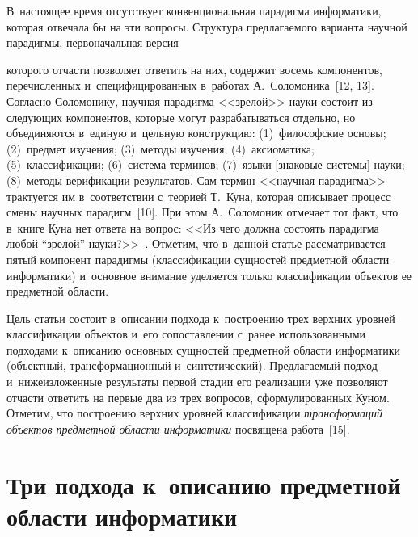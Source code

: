 \begin{multicols}{2}
  В~настоящее время отсутствует конвенциональная парадигма информатики, 
которая отвечала бы на эти вопросы. Структура предлагаемого варианта 
научной парадигмы, первоначальная версия\linebreak\vspace*{-12pt}

\pagebreak

\noindent
 которого отчасти позволяет 
ответить на них, содержит восемь компонентов, перечисленных 
и~специфицированных в~работах А.~Соломоника~[12, 13]. Согласно 
Соломонику, научная парадигма <<зрелой>> науки состоит из следующих 
компонентов, которые могут разрабатываться отдельно, но объединяются 
в~единую и~цельную конструкцию: (1)~философские основы; (2)~предмет 
изучения; (3)~методы изучения; (4)~аксиоматика; (5)~классификации;  
(6)~сис\-те\-ма терминов; (7)~языки [знаковые системы] науки; (8)~методы 
верификации результатов. Сам термин <<научная парадигма>> трактуется им 
в~соответствии с~теорией Т.~Куна, которая описывает процесс смены научных 
парадигм~[10]. При этом А.~Соломоник отмечает тот факт, что в~книге Куна 
нет ответа на вопрос: <<Из чего должна состоять парадигма любой ``зрелой'' 
науки?>>~\cite[с.~23]{14-zac}. Отметим, что в~данной статье рассматривается 
пятый компонент парадигмы (классификации сущностей предметной об\-ласти 
информатики) и~основное внимание уделяется только классификации объектов 
ее предметной об\-ласти.
  
  Цель статьи состоит в~описании подхода к~построению трех верхних уровней 
классификации объектов и~его сопоставлении с~ранее использованными 
подходами к~описанию основных сущностей предметной области информатики 
(объектный, трансформационный и~синтетический). Предлагаемый подход 
и~нижеизложенные результаты первой стадии его реализации уже позволяют 
отчасти ответить на первые два из трех вопросов, сформулированных Куном. 
Отметим, что построению верхних уровней классификации 
\textit{трансформаций объектов предметной области информатики} 
посвящена работа~[15].

\vspace*{-6pt}
  
\section{Три подхода к~описанию предметной области 
информатики}

\vspace*{-3pt}


\end{multicols}
